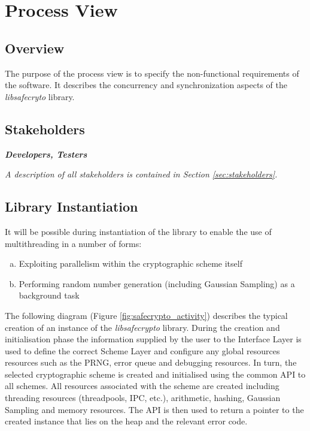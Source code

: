 \section{Process View}
\label{sec_process}

\subsection{Overview}

The purpose of the process view is to specify the non-functional requirements of the software. It describes the concurrency and synchronization aspects of the \textit{libsafecryto} library.

\subsection{Stakeholders}

\textbf{\textit{Developers, Testers}}

\textit{A description of all stakeholders is contained in Section \ref{sec:stakeholders}.}

\subsection{Library Instantiation}

It will be possible during instantiation of the library to enable the use of multithreading in a number of forms:

\begin{enumerate}[(a)]
\item Exploiting parallelism within the cryptographic scheme itself
\item Performing random number generation (including Gaussian Sampling) as a background task
\end{enumerate}

The following diagram (Figure \ref{fig:safecrypto_activity}) describes the typical creation of an instance of the \textit{libsafecrypto} library. During the creation and initialisation phase the information supplied by the user to the Interface Layer is used to define the correct Scheme Layer and configure any global resources resources such as the PRNG, error queue and debugging resources. In turn, the selected cryptographic scheme is created and initialised using the common API to all schemes. All resources associated with the scheme are created including threading resources (threadpools, IPC, etc.), arithmetic, hashing, Gaussian Sampling and memory resources. The API is then used to return a pointer to the created instance that lies on the heap and the relevant error code.

